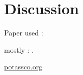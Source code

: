 \section{Discussion}\label{sec:discussion}

Paper used :

mostly : \cite{mueller2010commonsense}.

\url{potassco.org}
